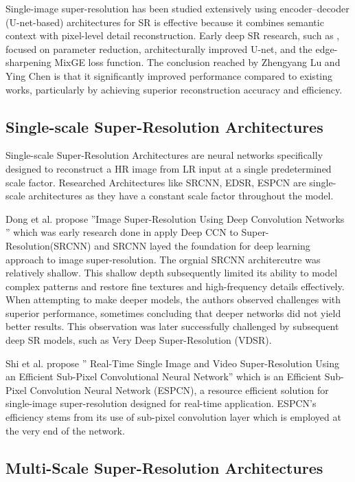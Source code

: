 Single-image super-resolution has been studied extensively using encoder--decoder (U-net-based) architectures for SR is effective because it combines semantic context with pixel-level detail reconstruction. Early deep SR research, such as \cite{super1}, focused on parameter reduction, architecturally improved U-net, and the edge-sharpening MixGE loss function. The conclusion reached by Zhengyang Lu and Ying Chen is that it significantly improved performance compared to existing works, particularly by achieving superior reconstruction accuracy and efficiency. 




\subsection{Single-scale Super-Resolution Architectures}

Single-scale Super-Resolution Architectures are neural networks specifically designed to reconstruct a HR image from LR input at a single predetermined scale factor. Researched Architectures like SRCNN, EDSR, ESPCN are single-scale architectures as they have a constant scale factor throughout the model. 

Dong et al. propose ''Image Super-Resolution Using Deep Convolution Networks '' which was early research done in apply Deep CCN to Super-Resolution(SRCNN) and SRCNN layed the foundation for deep learning approach to image super-resolution\cite{dong2015srcnn}. The orgnial SRCNN architercutre was relatively shallow. This shallow depth subsequently limited its ability to model complex patterns and restore fine textures and high-frequency details effectively. When attempting to make deeper models, the authors observed challenges with superior performance, sometimes concluding that deeper networks did not yield better results. This observation was later successfully challenged by subsequent deep SR models, such as Very Deep Super-Resolution (VDSR)\cite{kim2016vdsr}. 

Shi et al. propose '' Real-Time Single Image and Video Super-Resolution Using an Efficient  Sub-Pixel Convolutional Neural Network'' which is an Efficient Sub-Pixel Convolution Neural Network (ESPCN), a resource efficient solution for single-image super-resolution designed for real-time application. ESPCN's efficiency stems from its use of sub-pixel convolution layer which is employed at the very end of the network. 



\subsection{Multi-Scale Super-Resolution Architectures}

